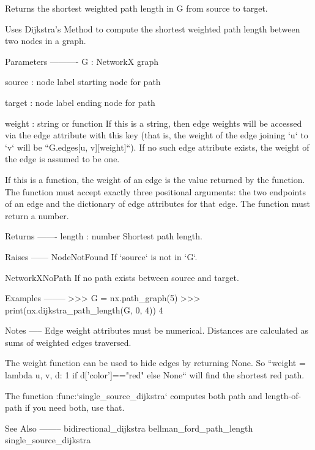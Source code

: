 \begin{DoxyVerb}Returns the shortest weighted path length in G from source to target.

Uses Dijkstra's Method to compute the shortest weighted path length
between two nodes in a graph.

Parameters
----------
G : NetworkX graph

source : node label
    starting node for path

target : node label
    ending node for path

weight : string or function
    If this is a string, then edge weights will be accessed via the
    edge attribute with this key (that is, the weight of the edge
    joining `u` to `v` will be ``G.edges[u, v][weight]``). If no
    such edge attribute exists, the weight of the edge is assumed to
    be one.

    If this is a function, the weight of an edge is the value
    returned by the function. The function must accept exactly three
    positional arguments: the two endpoints of an edge and the
    dictionary of edge attributes for that edge. The function must
    return a number.

Returns
-------
length : number
    Shortest path length.

Raises
------
NodeNotFound
    If `source` is not in `G`.

NetworkXNoPath
    If no path exists between source and target.

Examples
--------
>>> G = nx.path_graph(5)
>>> print(nx.dijkstra_path_length(G, 0, 4))
4

Notes
-----
Edge weight attributes must be numerical.
Distances are calculated as sums of weighted edges traversed.

The weight function can be used to hide edges by returning None.
So ``weight = lambda u, v, d: 1 if d['color']=="red" else None``
will find the shortest red path.

The function :func:`single_source_dijkstra` computes both
path and length-of-path if you need both, use that.

See Also
--------
bidirectional_dijkstra
bellman_ford_path_length
single_source_dijkstra\end{DoxyVerb}
 \mbox{\label{namespacenetworkx_1_1algorithms_1_1shortest__paths_1_1weighted_aa626ff4e7f1c29c88f1fd9711b33b1ba}} 
